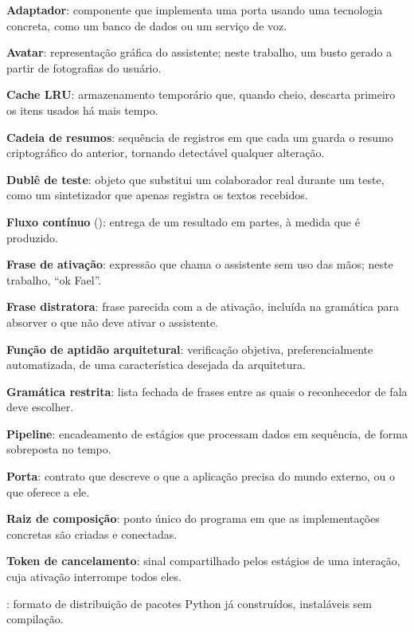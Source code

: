 \endgroup

\begingroup
\singlespacing
\setlength{\parindent}{0pt}
\setlength{\parskip}{8pt}

\textbf{Adaptador}: componente que implementa uma porta usando uma tecnologia concreta, como um banco de
dados ou um serviço de voz.

\textbf{Avatar}: representação gráfica do assistente; neste trabalho, um busto gerado a partir de
fotografias do usuário.

\textbf{Cache LRU}: armazenamento temporário que, quando cheio, descarta primeiro os itens usados há
mais tempo.

\textbf{Cadeia de resumos}: sequência de registros em que cada um guarda o resumo criptográfico do
anterior, tornando detectável qualquer alteração.

\textbf{Dublê de teste}: objeto que substitui um colaborador real durante um teste, como um sintetizador
que apenas registra os textos recebidos.

\textbf{Fluxo contínuo} (): entrega de um resultado em partes, à medida que é produzido.

\textbf{Frase de ativação}: expressão que chama o assistente sem uso das mãos; neste trabalho, “ok Fael”.

\textbf{Frase distratora}: frase parecida com a de ativação, incluída na gramática para absorver o que
não deve ativar o assistente.

\textbf{Função de aptidão arquitetural}: verificação objetiva, preferencialmente automatizada, de uma
característica desejada da arquitetura.

\textbf{Gramática restrita}: lista fechada de frases entre as quais o reconhecedor de fala deve escolher.

\textbf{Pipeline}: encadeamento de estágios que processam dados em sequência, de forma sobreposta no
tempo.

\textbf{Porta}: contrato que descreve o que a aplicação precisa do mundo externo, ou o que oferece a ele.

\textbf{Raiz de composição}: ponto único do programa em que as implementações concretas são criadas e
conectadas.

\textbf{Token de cancelamento}: sinal compartilhado pelos estágios de uma interação, cuja ativação
interrompe todos eles.

\textbf{}: formato de distribuição de pacotes Python já construídos, instaláveis sem
compilação.

